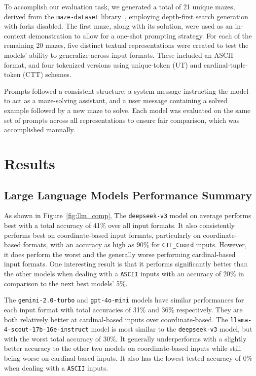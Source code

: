 \documentclass[conference]{IEEEtran}
\begin{document}
To accomplish our evaluation task, we generated a total of 21 unique mazes, derived from the \texttt{maze-dataset} library~\cite{ivanitskiy}, employing depth-first search generation with forks disabled. The first maze, along with its solution, were used as an in-context demonstration to allow for a one-shot prompting strategy. For each of the remaining 20 mazes, five distinct textual representations were created to test the models' ability to generalize across input formats. These included an ASCII format, and four tokenized versions using unique-token (UT) and cardinal-tuple-token (CTT) schemes. 

Prompts followed a consistent structure: a system message instructing the model to act as a maze-solving assistant, and a user message containing a solved example followed by a new maze to solve. Each model was evaluated on the same set of prompts across all representations to ensure fair comparison, which was accomplished manually.

\section{Results}
\subsection{Large Language Models Performance Summary}
As shown in Figure~\ref{fig:llm_comp}, The \texttt{deepseek-v3} model on average performs best with a total accuracy of 41\% over all input formats. It also consistently performs best on coordinate-based input formats, particularly on coordinate-based formats, with an accuracy as high as 90\% for \texttt{CTT\_Coord} inputs. However, it does perform the worst and the generally worse performing cardinal-based input formats. One interesting result is that it performs significantly better than the other models when dealing with a \texttt{ASCII} inputs with an accuracy of 20\% in comparison to the next best models' 5\%.

The \texttt{gemini-2.0-turbo} and \texttt{gpt-4o-mini} models have similar performances for each input format with total accuracies of 31\% and 36\% respectively. They are both relatively better at cardinal-based inputs over coordinate-based. The \texttt{llama-4-scout-17b-16e-instruct} model is most similar to the \texttt{deepseek-v3} model, but with the worst total accuracy of 30\%. It generally underperforms with a slightly better accuracy to the other two models on coordinate-based inputs while still being worse on cardinal-based inputs. It also has the lowest tested accuracy of 0\% when dealing with a \texttt{ASCII} inputs.
\end{document}
